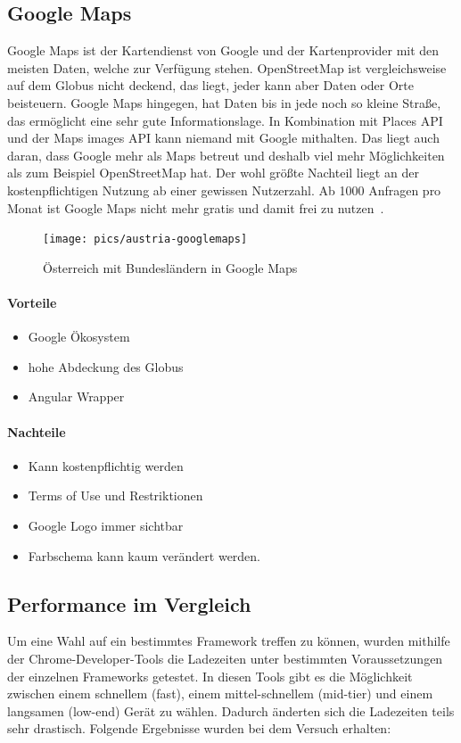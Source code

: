 \subsection{Google Maps}
Google Maps ist der Kartendienst von Google und der Kartenprovider mit den meisten Daten, welche zur Verfügung stehen.
OpenStreetMap ist vergleichsweise auf dem Globus nicht deckend, das liegt, jeder kann aber Daten oder Orte beisteuern.
Google Maps hingegen, hat Daten bis in jede noch so kleine Straße, das ermöglicht eine sehr gute Informationslage.
In Kombination mit Places API und der Maps images API kann niemand mit Google mithalten.
Das liegt auch daran, dass Google mehr als Maps betreut und deshalb viel mehr Möglichkeiten als zum Beispiel OpenStreetMap hat.
Der wohl größte Nachteil liegt an der kostenpflichtigen Nutzung ab einer gewissen Nutzerzahl.
Ab 1000 Anfragen pro Monat ist Google Maps nicht mehr gratis und damit frei zu nutzen~\cite{google-maps-vs-osm}.

\begin{figure}[hbt!]
    \centering
    \texttt{[image: pics/austria-googlemaps]}
    \caption{Österreich mit Bundesländern in Google Maps}
    \label{fig:austria-googlemaps}
\end{figure}

\paragraph{Vorteile}
\begin{itemize}
    \item Google Ökosystem
    \item hohe Abdeckung des Globus
    \item Angular Wrapper
\end{itemize}

\paragraph{Nachteile}
\begin{itemize}
    \item Kann kostenpflichtig werden
    \item Terms of Use und Restriktionen
    \item Google Logo immer sichtbar
    \item Farbschema kann kaum verändert werden.
\end{itemize}

\cleardoublepage

\subsection{Performance im Vergleich}
Um eine Wahl auf ein bestimmtes Framework treffen zu können, wurden mithilfe der Chrome-Developer-Tools die Ladezeiten
unter bestimmten Voraussetzungen der einzelnen Frameworks getestet.
In diesen Tools gibt es die Möglichkeit zwischen einem schnellem (fast), einem mittel-schnellem (mid-tier) und einem
langsamen (low-end) Gerät zu wählen.
Dadurch änderten sich die Ladezeiten teils sehr drastisch.
Folgende Ergebnisse wurden bei dem Versuch erhalten:


